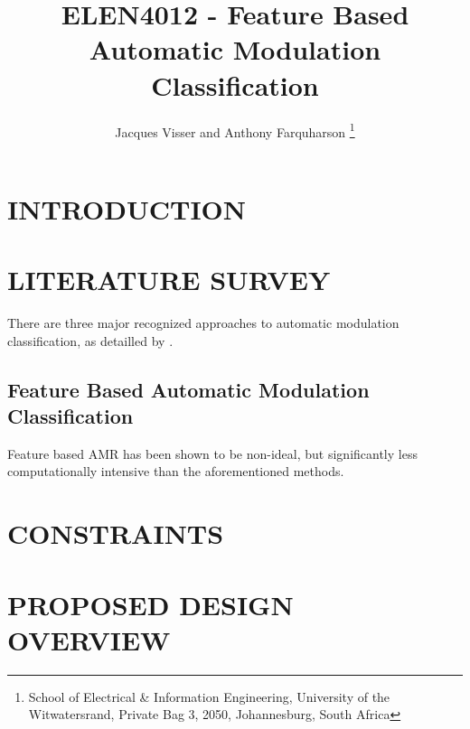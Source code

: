 \documentclass[10pt,twocolumn]{witseiepaper}
\begin{document}
\title{ELEN4012 - Feature Based Automatic Modulation Classification}

\author{Jacques Visser and Anthony Farquharson
\thanks{School of Electrical \& Information Engineering, University of the
Witwatersrand, Private Bag 3, 2050, Johannesburg, South Africa}
}



\maketitle
\thispagestyle{empty}\pagestyle{empty}

\section{INTRODUCTION}

\section{LITERATURE SURVEY}
There are three major recognized approaches to automatic modulation classification, as detailled by \cite{zhu2014automatic}.

\subsection{Feature Based Automatic Modulation Classification}
Feature based AMR has been shown to be non-ideal, but significantly less computationally intensive\cite{zhu2014automatic} than the aforementioned methods.

\section{CONSTRAINTS}

\section{PROPOSED DESIGN OVERVIEW}
\end{document}
